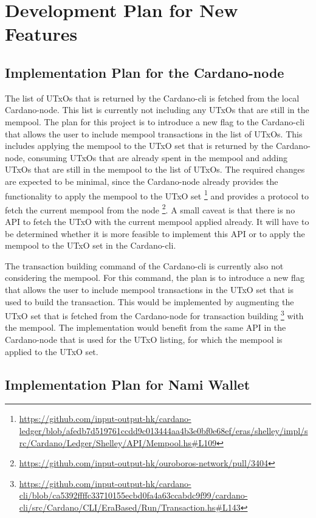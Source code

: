 \documentclass[11pt]{article}
\begin{document}
\section{Development Plan for New Features}
\label{sec:devplan}

\subsection{Implementation Plan for the Cardano-node}

The list of UTxOs that is returned by the Cardano-cli is fetched from the local Cardano-node.
This list is currently not including any UTxOs that are still in the mempool.
The plan for this project is to introduce a new flag to the Cardano-cli that allows the user to include mempool transactions in the list of UTxOs.
This includes applying the mempool to the UTxO set that is returned by the Cardano-node, consuming UTxOs that are already spent in the mempool and
adding UTxOs that are still in the mempool to the list of UTxOs.
The required changes are expected to be minimal, since the Cardano-node already provides the functionality to apply the mempool to the UTxO set \footnote{\url{https://github.com/input-output-hk/cardano-ledger/blob/afedb7d519761ccdd9c013444aa4b3e0bf0e68ef/eras/shelley/impl/src/Cardano/Ledger/Shelley/API/Mempool.hs\#L109}}
and provides a protocol to fetch the current mempool from the node \footnote{\url{https://github.com/input-output-hk/ouroboros-network/pull/3404}}.
A small caveat is that there is no API to fetch the UTxO with the current mempool applied already.
It will have to be determined whether it is more feasible to implement this API or to apply the mempool to the UTxO set in the Cardano-cli.

The transaction building command of the Cardano-cli is currently also not considering the mempool.
For this command, the plan is to introduce a new flag that allows the user to include mempool transactions in the UTxO set that is used to build the transaction.
This would be implemented by augmenting the UTxO set that is fetched from the Cardano-node for transaction building \footnote{\url{https://github.com/input-output-hk/cardano-cli/blob/ca5392ffffc33710155ecbd0fa4a63ccabdc9f99/cardano-cli/src/Cardano/CLI/EraBased/Run/Transaction.hs\#L143}} with the mempool.
The implementation would benefit from the same API in the Cardano-node that is used for the UTxO listing, for which the mempool is applied to the UTxO set.

\subsection{Implementation Plan for Nami Wallet}
\end{document}
